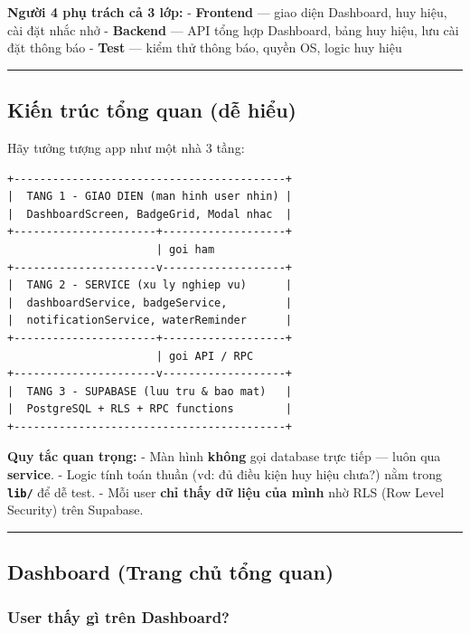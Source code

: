 \documentclass[12pt,a4paper]{article}
\begin{document}
\textbf{Người 4 phụ trách cả 3 lớp:} - \textbf{Frontend} --- giao diện
Dashboard, huy hiệu, cài đặt nhắc nhở - \textbf{Backend} --- API tổng
hợp Dashboard, bảng huy hiệu, lưu cài đặt thông báo - \textbf{Test} ---
kiểm thử thông báo, quyền OS, logic huy hiệu

\begin{center}\rule{0.5\linewidth}{0.5pt}\end{center}

\subsection{Kiến trúc tổng quan (dễ
hiểu)}\label{kiux1ebfn-truxfac-tux1ed5ng-quan-dux1ec5-hiux1ec3u}

Hãy tưởng tượng app như một nhà 3 tầng:

\begin{verbatim}
+------------------------------------------+
|  TANG 1 - GIAO DIEN (man hinh user nhin) |
|  DashboardScreen, BadgeGrid, Modal nhac  |
+----------------------+-------------------+
                       | goi ham
+----------------------v-------------------+
|  TANG 2 - SERVICE (xu ly nghiep vu)      |
|  dashboardService, badgeService,         |
|  notificationService, waterReminder      |
+----------------------+-------------------+
                       | goi API / RPC
+----------------------v-------------------+
|  TANG 3 - SUPABASE (luu tru & bao mat)   |
|  PostgreSQL + RLS + RPC functions        |
+------------------------------------------+
\end{verbatim}

\textbf{Quy tắc quan trọng:} - Màn hình \textbf{không} gọi database trực
tiếp --- luôn qua \textbf{service}. - Logic tính toán thuần (vd: đủ điều
kiện huy hiệu chưa?) nằm trong \textbf{\texttt{lib/}} để dễ test. - Mỗi
user \textbf{chỉ thấy dữ liệu của mình} nhờ RLS (Row Level Security)
trên Supabase.

\begin{center}\rule{0.5\linewidth}{0.5pt}\end{center}

\subsection{Dashboard (Trang chủ tổng
quan)}\label{dashboard-trang-chux1ee7-tux1ed5ng-quan}

\subsubsection{User thấy gì trên
Dashboard?}\label{user-thux1ea5y-guxec-truxean-dashboard}
\end{document}
